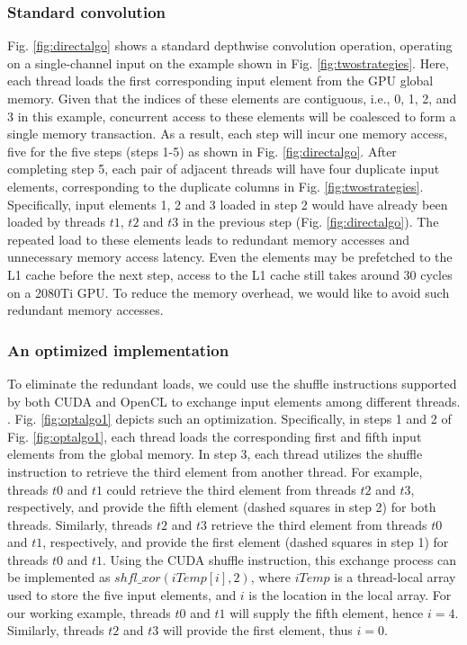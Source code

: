 \subsubsection{Standard convolution} Fig. \ref{fig:directalgo} shows a standard depthwise convolution operation, operating on a single-channel input on the example shown in Fig. \ref{fig:twostrategies}.
Here, each thread loads the first corresponding input element from the GPU global memory. Given that the indices of these elements are
contiguous, i.e., 0, 1, 2, and 3 in this example, concurrent access to these elements will be coalesced to form a single memory
transaction. As a result, each step will incur one memory access, five for the five steps (steps 1-5) as shown in Fig.
\ref{fig:directalgo}. After completing step 5, each pair of adjacent threads will have four duplicate input elements, corresponding to the
duplicate columns in Fig. \ref{fig:twostrategies}. Specifically, input elements 1, 2 and 3 loaded in step 2 would have already been
loaded by threads $t1$, $t2$ and $t3$ in the previous step (Fig. \ref{fig:directalgo}). The repeated load to these elements leads to
redundant memory accesses and unnecessary memory access latency. Even the elements may be prefetched to the L1 cache before the next step,
access to the L1 cache still takes around 30 cycles on a 2080Ti GPU. To reduce the memory overhead, we would like to avoid such redundant
memory accesses.

\subsubsection{An optimized implementation} To eliminate the redundant loads, we could use the shuffle instructions supported by both CUDA and OpenCL to exchange input elements among
different threads. . Fig. \ref{fig:optalgo1}
depicts such an optimization. Specifically, in steps 1 and 2 of Fig. \ref{fig:optalgo1}, each thread loads the corresponding first and
fifth input elements from the global memory. In step 3, each thread utilizes the shuffle instruction to retrieve the third element from
another thread. For example, threads $t0$ and $t1$ could retrieve the third element from threads $t2$ and $t3$, respectively, and provide
the fifth element (dashed squares in step 2) for both threads. Similarly, threads $t2$ and $t3$ retrieve the third element from threads
$t0$ and $t1$, respectively, and provide the first element (dashed squares in step 1) for threads $t0$ and $t1$. Using the CUDA shuffle
instruction, this exchange process can be implemented as $shfl\_xor(iTemp[i],2)$, where $iTemp$ is a thread-local array used to store the
five input elements, and $i$ is the location in the local array. For our working example, threads $t0$ and $t1$ will supply the fifth
element, hence $i=4$. Similarly, threads $t2$ and $t3$ will provide the first element, thus $i=0$.

